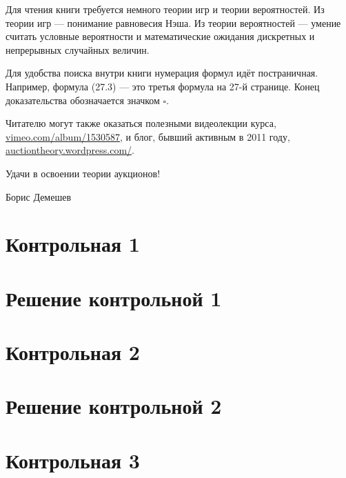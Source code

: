 \documentclass[11pt, openany]{book}
\numberwithin{equation}{page} %
\theoremstyle{definition} %
\theoremstyle{definition}
\theoremstyle{definition}
\begin{document}
Для чтения книги требуется немного теории игр и теории вероятностей. Из теории игр — понимание равновесия Нэша. Из теории вероятностей — умение считать условные вероятности и математические ожидания дискретных и непрерывных случайных величин.

Для удобства поиска внутри книги нумерация формул идёт постраничная. Например, формула (27.3) — это третья формула на 27-й странице. Конец доказательства обозначается значком $\square$.

Читателю могут также оказаться полезными видеолекции курса, \url{vimeo.com/album/1530587}, и блог, бывший активным в 2011 году, \url{auctiontheory.wordpress.com/}.

Удачи в освоении теории аукционов!

\begin{flushright}
  Борис Демешев
\end{flushright}




\section{Контрольная 1}



\section{Решение контрольной 1}






\section{Контрольная 2}



\section{Решение контрольной 2}





\section{Контрольная 3}


\end{document}
